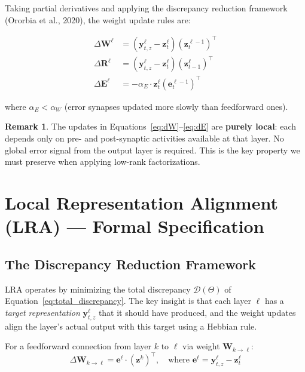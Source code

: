 \documentclass[11pt]{article}
\theoremstyle{definition}
\newtheorem{remark}{Remark}[section]
\newcommand{\vz}{\mathbf{z}}
\newcommand{\vy}{\mathbf{y}}
\newcommand{\ve}{\mathbf{e}}
\newcommand{\W}{\mathbf{W}}
\newcommand{\R}{\mathbf{R}}
\newcommand{\E}{\mathbf{E}}
\begin{document}
Taking partial derivatives and applying the discrepancy reduction framework
(Ororbia et al., 2020), the weight update rules are:

\begin{align}
  \Delta \W^\ell &= \left(\vy^\ell_{t,z} - \vz^\ell_t\right) \left(\vz^{\ell-1}_t\right)^\top \label{eq:dW} \\
  \Delta \R^\ell &= \left(\vy^\ell_{t,z} - \vz^\ell_t\right) \left(\vz^\ell_{t-1}\right)^\top \label{eq:dR} \\
  \Delta \E^\ell &= -\alpha_E \cdot \vz^\ell_t \left(\ve^{\ell-1}_t\right)^\top \label{eq:dE}
\end{align}

where $\alpha_E < \alpha_W$ (error synapses updated more slowly than feedforward ones).

\begin{remark}
The updates in Equations~\eqref{eq:dW}--\eqref{eq:dE} are \textbf{purely local}:
each depends only on pre- and post-synaptic activities available at that layer.
No global error signal from the output layer is required. This is the key property
we must preserve when applying low-rank factorizations.
\end{remark}

\section{Local Representation Alignment (LRA) — Formal Specification}

\subsection{The Discrepancy Reduction Framework}

LRA operates by minimizing the total discrepancy $\mathcal{D}(\Theta)$ of
Equation~\eqref{eq:total_discrepancy}. The key insight is that each layer
$\ell$ has a \emph{target representation} $\vy^\ell_{t,z}$ that it should
have produced, and the weight updates align the layer's actual output with
this target using a Hebbian rule.

For a feedforward connection from layer $k$ to $\ell$ via weight $\W_{k \to \ell}$:
\begin{equation}
  \Delta \W_{k \to \ell} = \ve^\ell \cdot \left(\vz^k\right)^\top,
  \quad \text{where } \ve^\ell = \vy^\ell_{t,z} - \vz^\ell_t
\end{equation}
\end{document}
